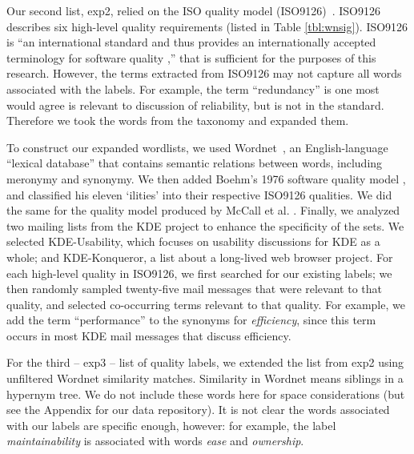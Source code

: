 \documentclass{acm_proc_article-sp}
\begin{document}
Our second list, \textsf{exp2}, relied on the ISO quality model (ISO9126)~\cite{iso9126}. ISO9126 describes six high-level quality requirements (listed in Table \ref{tbl:wnsig}). 
ISO9126 is ``an international standard and thus provides an internationally accepted terminology for software quality \cite[p. 58]{Bøegh2008},'' that is sufficient for the purposes of this research.
However, the terms extracted from ISO9126 may not capture all words associated with the labels.  For example, the term ``redundancy'' is one most would agree is relevant to discussion of reliability, but is not in the standard. Therefore we took the words from the taxonomy and expanded them.


To construct our expanded wordlists, we used Wordnet~\cite{Fellbaum1998}, an English-language ``lexical database'' that contains semantic relations between words, including meronymy and synonymy. We then added Boehm’s 1976 software quality model \cite{Boehm+:1976:ICSE}, and classified his eleven ‘ilities’ into their respective ISO9126 qualities. We did the same for the quality model produced by McCall et al. \cite{mccall1977}. Finally, we analyzed two mailing lists from the KDE project to enhance the specificity of the sets. We selected KDE-Usability, which focuses on usability discussions for KDE as a whole; and KDE-Konqueror, a list about a long-lived web browser project. For each high-level quality in ISO9126, we first searched for our existing labels; we then randomly sampled twenty-five mail messages that were relevant to that quality, and selected co-occurring terms relevant to that quality. For example, we add the term ``performance'' to the synonyms for \emph{efficiency}, since this term occurs in most KDE mail messages that discuss efficiency.

For the third -- \textsf{exp3} -- list of quality labels, we extended the list from \textsf{exp2} using unfiltered Wordnet similarity matches. Similarity in Wordnet means siblings in a hypernym tree. We do not include these words here for space considerations (but see the Appendix for our data repository). It is not clear the words associated with our labels are specific enough, however: for example, the label \emph{maintainability} is associated with words \emph{ease} and \emph{ownership}.
\end{document}
